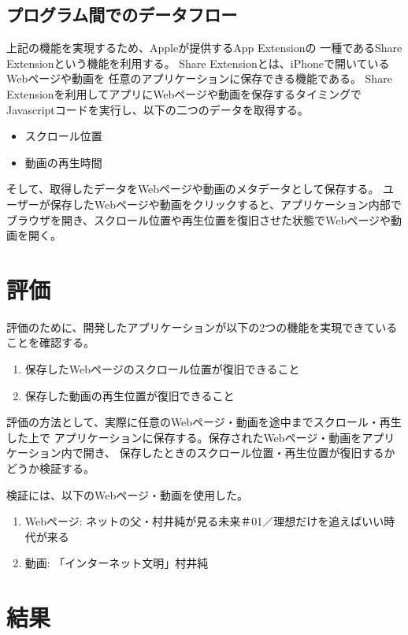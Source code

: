 \documentclass[a4j,10pt]{jsarticle}
\begin{document}
\subsection{プログラム間でのデータフロー}
上記の機能を実現するため、Appleが提供するApp Extension\cite{App-Extension}の
一種であるShare Extension\cite{Share-Extension}という機能を利用する。
Share Extensionとは、iPhoneで開いているWebページや動画を
任意のアプリケーションに保存できる機能である。
Share Extensionを利用してアプリにWebページや動画を保存するタイミングで
Javascriptコードを実行し、以下の二つのデータを取得する。
\begin{itemize}
\item スクロール位置
\item 動画の再生時間
\end{itemize}

そして、取得したデータをWebページや動画のメタデータとして保存する。
ユーザーが保存したWebページや動画をクリックすると、アプリケーション内部で
ブラウザを開き、スクロール位置や再生位置を復旧させた状態でWebページや動画を開く。


\section{評価}
評価のために、開発したアプリケーションが以下の2つの機能を実現できていることを確認する。
\begin{enumerate}
\item 保存したWebページのスクロール位置が復旧できること
\item 保存した動画の再生位置が復旧できること
\end{enumerate}

評価の方法として、実際に任意のWebページ・動画を途中までスクロール・再生した上で
アプリケーションに保存する。保存されたWebページ・動画をアプリケーション内で開き、
保存したときのスクロール位置・再生位置が復旧するかどうか検証する。

検証には、以下のWebページ・動画を使用した。
\begin{enumerate}
\item Webページ: ネットの父・村井純が見る未来＃01／理想だけを追えばいい時代が来る\cite{murai-web-page}
\item 動画: 「インターネット文明」村井純\cite{murai-video}
\end{enumerate}

\section{結果}
\end{document}
